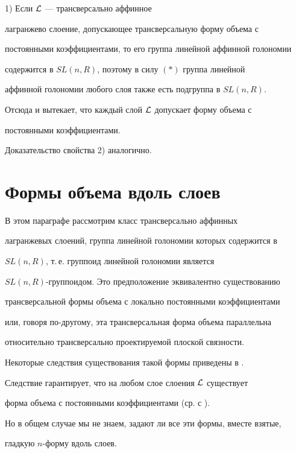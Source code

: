 \begin{pf} 1) Если ${\cal L}$ --- трансверсально аффинное


лагранжево слоение, допускающее трансверсальную форму объема с


постоянными коэффициентами, то его группа линейной аффинной голономии


содержится в $SL(n, R)$, поэтому в силу $(*)$ группа линейной


аффинной голономии любого слоя также есть подгруппа в $SL(n,R)$.


Отсюда и вытекает, что каждый слой $\cal L$ допускает форму объема с


постоянными коэффициентами.





Доказательство свойства 2) аналогично.


\end{pf}





\section{Формы объема вдоль слоев}





В этом параграфе рассмотрим класс трансверсально аффинных


лагранжевых слоений, группа линейной голономии которых содержится в


$SL(n, R)$, т.\,е. группоид линейной голономии является


$SL(n,R)$-группоидом. Это предположение эквивалентно существованию


трансверсальной формы объема с локально постоянными коэффициентами


или, говоря по-другому, эта трансверсальная форма объема параллельна


относительно трансверсально проектируемой плоской связности.


Некоторые следствия существования такой формы приведены в \cite{WO6}.


Следствие гарантирует, что на любом слое слоения $\cal L$ существует


форма объема с постоянными коэффициентами (ср. с \cite{FGH1}).


Но в общем случае мы не знаем, задают ли все эти формы, вместе взятые,


гладкую $n$-форму вдоль слоев.





